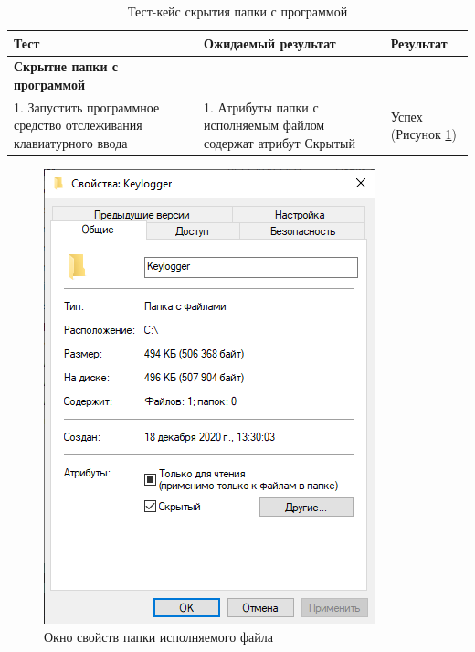 \begin{table}[ht]
	\caption{Тест-кейс скрытия папки с программой}
	\label{table:testing:func:test4}
	\centering
	  \begin{tabular}{| >{\raggedright}m{} 
					  | >{\raggedright}m{} 
					  | >{\raggedright\arraybackslash}m{}|}
	  \hline Тест & Ожидаемый результат  & Результат \\
	  \hline \textbf{Скрытие папки с программой} \\ 1. Запустить программное средство отслеживания клавиатурного ввода & 1. Атрибуты папки с исполняемым файлом содержат атрибут Скрытый & Успех (Рисунок \ref*{sec:testing:func:folderProps})\\
	  \hline
	  \end{tabular}
\end{table}

\clearpage

\begin{figure}[ht]
	\centering
	  \includegraphics[scale=0.9]{attachments/hiddenFolder.png}  
	  \caption{ Окно свойств папки исполняемого файла}
	  \label{sec:testing:func:folderProps}
\end{figure}

